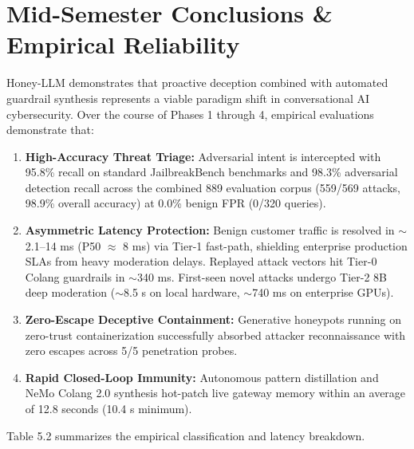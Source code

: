 \documentclass[12pt,a4paper,oneside]{report}
\begin{document}
\section{Mid-Semester Conclusions \& Empirical Reliability}
Honey-LLM demonstrates that proactive deception combined with automated guardrail synthesis represents a viable paradigm shift in conversational AI cybersecurity. Over the course of Phases 1 through 4, empirical evaluations demonstrate that:
\begin{enumerate}
    \item \textbf{High-Accuracy Threat Triage:} Adversarial intent is intercepted with 95.8\% recall on standard JailbreakBench benchmarks and 98.3\% adversarial detection recall across the combined 889 evaluation corpus (559/569 attacks, 98.9\% overall accuracy) at 0.0\% benign FPR (0/320 queries).
    \item \textbf{Asymmetric Latency Protection:} Benign customer traffic is resolved in $\sim$2.1--14 ms (P50 $\approx$ 8 ms) via Tier-1 fast-path, shielding enterprise production SLAs from heavy moderation delays. Replayed attack vectors hit Tier-0 Colang guardrails in $\sim$340 ms. First-seen novel attacks undergo Tier-2 8B deep moderation ($\sim$8.5 s on local hardware, $\sim$740 ms on enterprise GPUs).
    \item \textbf{Zero-Escape Deceptive Containment:} Generative honeypots running on zero-trust containerization successfully absorbed attacker reconnaissance with zero escapes across 5/5 penetration probes.
    \item \textbf{Rapid Closed-Loop Immunity:} Autonomous pattern distillation and NeMo Colang 2.0 synthesis hot-patch live gateway memory within an average of 12.8 seconds (10.4 s minimum).
\end{enumerate}
Table 5.2 summarizes the empirical classification and latency breakdown.
\end{document}
